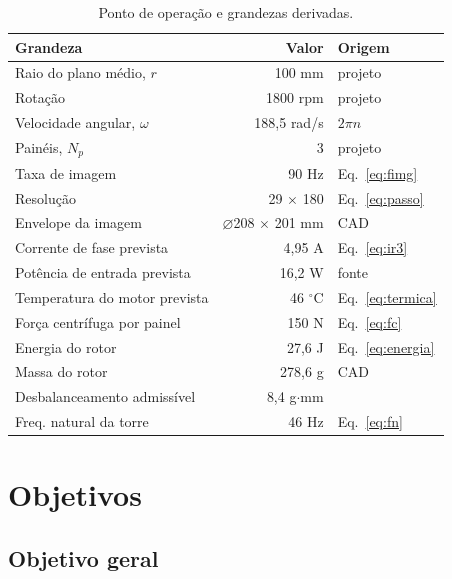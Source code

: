 \documentclass[10pt,a4paper,twocolumn]{article}
\begin{document}
\begin{table}[t]
\centering
\caption{Ponto de operação e grandezas derivadas.}
\label{tab:parametros}
\footnotesize
\setlength{\tabcolsep}{4pt}
\begin{tabular}{@{}lrl@{}}
\toprule
\textbf{Grandeza} & \textbf{Valor} & \textbf{Origem} \\
\midrule
Raio do plano médio, $r$        & 100 mm      & projeto \\
Rotação                          & 1800 rpm    & projeto \\
Velocidade angular, $\omega$     & 188,5 rad/s & $2\pi n$ \\
Painéis, $N_p$                   & 3           & projeto \\
Taxa de imagem                   & 90 Hz       & Eq.~\eqref{eq:fimg} \\
Resolução                        & 29 $\times$ 180 & Eq.~\eqref{eq:passo} \\
Envelope da imagem               & $\varnothing$208 $\times$ 201 mm & CAD \\
Corrente de fase prevista        & 4,95 A      & Eq.~\eqref{eq:ir3} \\
Potência de entrada prevista     & 16,2 W      & fonte \\
Temperatura do motor prevista    & 46 $^\circ$C & Eq.~\eqref{eq:termica} \\
Força centrífuga por painel      & 150 N       & Eq.~\eqref{eq:fc} \\
Energia do rotor                 & 27,6 J      & Eq.~\eqref{eq:energia} \\
Massa do rotor                   & 278,6 g     & CAD \\
Desbalanceamento admissível      & 8,4 g$\cdot$mm & \cite{iso21940} \\
Freq. natural da torre           & 46 Hz       & Eq.~\eqref{eq:fn} \\
\bottomrule
\end{tabular}
\end{table}

\section{Objetivos}

\subsection{Objetivo geral}
\end{document}
